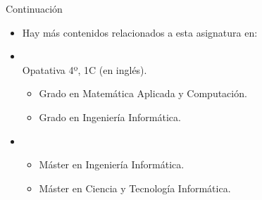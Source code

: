 \begin{frame}[t]{Continuación}
\begin{itemize}
  \item Hay más contenidos relacionados a esta asignatura en:

  \item {}\\
        Opatativa 4º, 1C (en inglés).
    \begin{itemize}
      \item Grado en Matemática Aplicada y Computación.
      \item Grado en Ingeniería Informática.
    \end{itemize}

  \item {}
    \begin{itemize}
      \item Máster en Ingeniería Informática.
      \item Máster en Ciencia y Tecnología Informática.
    \end{itemize}
\end{itemize}
\end{frame}
